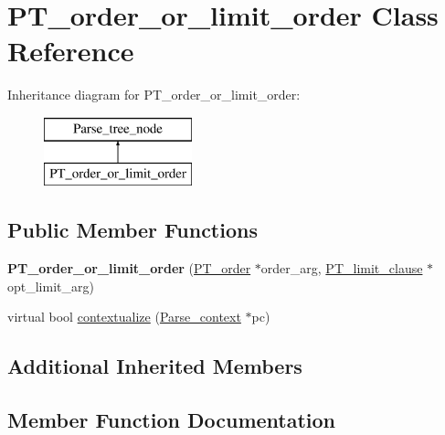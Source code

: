 \hypertarget{classPT__order__or__limit__order}{}\section{P\+T\+\_\+order\+\_\+or\+\_\+limit\+\_\+order Class Reference}
\label{classPT__order__or__limit__order}
Inheritance diagram for P\+T\+\_\+order\+\_\+or\+\_\+limit\+\_\+order\+:\begin{figure}[H]
\begin{center}
\leavevmode
\includegraphics[height=2.000000cm]{classPT__order__or__limit__order}
\end{center}
\end{figure}
\subsection*{Public Member Functions}
\begin{DoxyCompactItemize}
\item 
\mbox{\label{classPT__order__or__limit__order_a21f120ff7d3c3386462f5c7ad4fdbc3c}} 
{\bfseries P\+T\+\_\+order\+\_\+or\+\_\+limit\+\_\+order} (\mbox{\hyperlink{classPT__order}{P\+T\+\_\+order}} $\ast$order\+\_\+arg, \mbox{\hyperlink{classPT__limit__clause}{P\+T\+\_\+limit\+\_\+clause}} $\ast$opt\+\_\+limit\+\_\+arg)
\item 
virtual bool \mbox{\hyperlink{classPT__order__or__limit__order_a88b42ed7c81ca5a9456dfdd7b50b2982}{contextualize}} (\mbox{\hyperlink{structParse__context}{Parse\+\_\+context}} $\ast$pc)
\end{DoxyCompactItemize}
\subsection*{Additional Inherited Members}


\subsection{Member Function Documentation}
\mbox{\label{classPT__order__or__limit__order_a88b42ed7c81ca5a9456dfdd7b50b2982}} 
